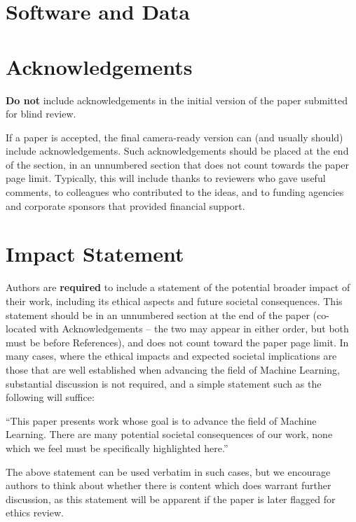 \documentclass{article}
\theoremstyle{plain}
\theoremstyle{definition}
\theoremstyle{remark}
\begin{document}
\section*{Software and Data}



\section*{Acknowledgements}

\textbf{Do not} include acknowledgements in the initial version of the paper
submitted for blind review.

If a paper is accepted, the final camera-ready version can (and usually should)
include acknowledgements.  Such acknowledgements should be placed at the end of
the section, in an unnumbered section that does not count towards the paper
page limit. Typically, this will include thanks to reviewers who gave useful
comments, to colleagues who contributed to the ideas, and to funding agencies
and corporate sponsors that provided financial support.

\section*{Impact Statement}

Authors are \textbf{required} to include a statement of the potential broader
impact of their work, including its ethical aspects and future societal
consequences. This statement should be in an unnumbered section at the end of
the paper (co-located with Acknowledgements -- the two may appear in either
order, but both must be before References), and does not count toward the paper
page limit. In many cases, where the ethical impacts and expected societal
implications are those that are well established when advancing the field of
Machine Learning, substantial discussion is not required, and a simple
statement such as the following will suffice:

``This paper presents work whose goal is to advance the field of Machine
Learning. There are many potential societal consequences of our work, none
which we feel must be specifically highlighted here.''

The above statement can be used verbatim in such cases, but we encourage
authors to think about whether there is content which does warrant further
discussion, as this statement will be apparent if the paper is later flagged
for ethics review.
\end{document}
